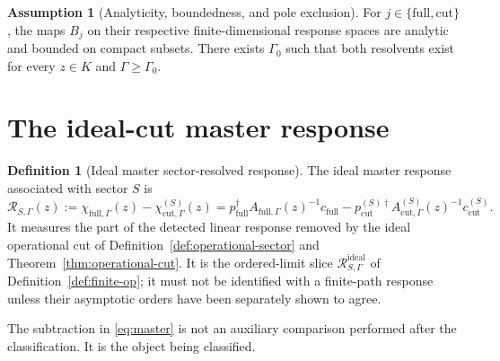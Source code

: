 \documentclass[11pt]{article}
\theoremstyle{definition}
\newtheorem{definition}[theorem]{Definition}
\newtheorem{assumption}[theorem]{Assumption}
\theoremstyle{remark}
\theoremstyle{plain}
\newcommand{\R}{\mathcal R}
\newcommand{\full}{\mathrm{full}}
\newcommand{\cut}{\mathrm{cut}}
\newcommand{\ideal}{\mathrm{ideal}}
\begin{document}
\begin{assumption}[Analyticity, boundedness, and pole exclusion]\label{ass:analytic}
For $j\in\{\full,\cut\}$, the maps $B_j$ on their respective finite-dimensional response spaces are analytic and bounded on compact subsets.  There exists $\Gamma_0$ such that both resolvents exist for every $z\in K$ and $\Gamma\ge\Gamma_0$.
\end{assumption}

\section{The ideal-cut master response}

\begin{definition}[Ideal master sector-resolved response]\label{def:master}
The ideal master response associated with sector $S$ is
\begin{equation}\label{eq:master}
  \boxed{
  \R_{S,\Gamma}(z)
  :=\chi_{\full,\Gamma}(z)-\chi_{\cut,\Gamma}^{(S)}(z)
  =p_{\full}^\dagger A_{\full,\Gamma}(z)^{-1}c_{\full}
  -p_{\cut}^{(S)\dagger}A_{\cut,\Gamma}^{(S)}(z)^{-1}c_{\cut}^{(S)} .}
\end{equation}
It measures the part of the detected linear response removed by the ideal
operational cut of Definition~\ref{def:operational-sector} and
Theorem~\ref{thm:operational-cut}.  It is the ordered-limit slice
$\R_{S,\Gamma}^{\ideal}$ of Definition~\ref{def:finite-op}; it must not be
identified with a finite-path response unless their asymptotic orders have
been separately shown to agree.
\end{definition}

The subtraction in \eqref{eq:master} is not an auxiliary comparison performed after the classification.  It is the object being classified.
\end{document}
